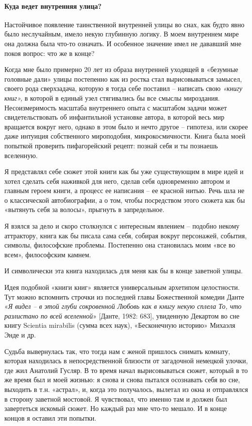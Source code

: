 \paragraph*{Куда ведет внутренняя улица?}
Настойчивое появление таинственной внутренней улицы во снах, как будто явно было неслучайным, имело некую глубинную логику. В моем внутреннем мире она должна была что-то означать. И особенное значение имел не дававший мне покоя вопрос: что же в конце?

Когда мне было примерно 20 лет из образа внутренней уходящей в «безумные головные дали» улицы постепенно как из ростка стал вырисовываться замысел, своего рода сверхзадача, которую я тогда себе поставил – написать свою \textit{«книгу книг»,} в которой в единый узел стягивались бы все смыслы мироздания. Несоизмеримость масштаба внутреннего опыта с масштабом задачи может свидетельствовать об инфантильной установке автора, в которой весь мир вращается вокруг него, однако в этом было и нечто другое – гипотеза, или скорее даже интуиция собственного мироподобия, микрокосмичности. Книга была моей попыткой проверить пифагорейский рецепт: познай себя и ты познаешь вселенную.

Я представлял себе сюжет этой книги как бы уже существующим в мире идей и хотел сделать себя наживкой для него, сделав себя одновременно автором и главным героем книги, а процесс ее написания – ее красной нитью. Речь шла не о классической автобиографии, а о том, чтобы посредством этого сюжета как бы «вытянуть себя за волосы», прыгнуть в запредельное.

Я взялся за дело и скоро столкнулся с интересным явлением – подобно некому аттрактору, книга как бы писала сама себя, собирая вокруг персонажей, события, символы, философские проблемы. Постепенно она становилась моим «все во всем», философским камнем.

И символически эта книга находилась для меня как бы в конце заветной улицы.

Идея подобной «книги книг» является универсальным архетипом целостности. Тут можно вспомнить строчки из последней главы Божественной комедии Данте «\textit{Я видел – в этой глуби сокровенной Любовь как в книгу некую сплела То, что разлистано по всей вселенной}» [Данте, 1982: 683], увиденную Декартом во сне книгу Scientia mirabilis (сумма всех наук), «Бесконечную историю» Михаэля Энде и др.

Судьба вывернулась так, что тогда нам с женой пришлось снимать комнату, которая находилась в непосредственной близости от загадочной немецкой улочки, где жил Анатолий Гусляр. В то время начал вырисовываться сюжет, который в то же время был и моей жизнью: я снова и снова пытался осознавать себя во сне, выходить в т.н. «астрал», и, когда это получалось, вылетал из окна и отправлялся в сторону заветной мостовой. Я чувствовал, что именно там и должен был завертеться искомый сюжет. Но каждый раз мне что-то мешало. И в конце концов я оставил эти попытки.

